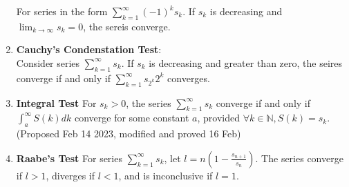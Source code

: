 \documentclass[../note.tex]{subfiles}
\begin{document}
\begin{theorem}
\begin{enumerate}
		For series in the form $\sum^{\infty}_{k=1}(-1)^{k}s_k$. If $s_k$ is decreasing and $\lim_{k\to \infty} s_k = 0$, the sereis converge. 
	\item \label{Cauchy_Condensation_Test} \textbf{Cauchy's Condenstation Test}:\\
		Consider series $\sum^{\infty}_{k=1}s_k$. If ${s_k}$ is decreasing and greater than zero, the seires converge if and only if $\sum^{\infty}_{k=1}s_{2^k}2^k $ converges. 
	\item \textbf{Integral Test}\label{IntegralTest}
		For $s_k>0$, the series $\sum^{\infty}_{k=1}s_k$ converge if and only if $\int_{a}^{\infty}S(k)dk$ converge for some constant $a$, provided $\forall k \in \mathbb{N}, S(k)=s_k$.
		(Proposed Feb 14 2023, modified and proved 16 Feb)
	\item \textbf{Raabe's Test}\label{Raabe's Test}
		For series $\sum^{\infty}_{k=1}s_k$, let $l= \displaystyle n\left(1-\frac{s_{n+1}}{s_n}\right)$. The series converge if $l>1$, diverges if $l<1$, and is inconclusive if $l=1$.

\end{enumerate}
\end{theorem}
\end{document}

